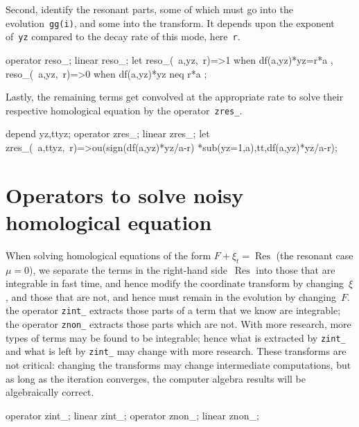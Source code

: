 \documentclass[11pt,a5paper]{article}
\newcommand{\res}{\operatorname{Res}}
\begin{document}
Second, identify the resonant parts, some of which must go into the evolution~\verb|gg(i)|, and some into the transform.
It depends upon the exponent of~\verb|yz| compared to the decay rate of this mode, here~\verb|r|.
\begin{reduce}
operator reso_; linear reso_;
let { reso_(~a,yz,~r)=>1 when df(a,yz)*yz=r*a
    , reso_(~a,yz,~r)=>0 when df(a,yz)*yz neq r*a
    };
\end{reduce}

Lastly, the remaining terms get convolved at the appropriate rate to solve their respective homological equation by the operator~\verb|zres_|.
\begin{reduce}
depend yz,ttyz;
operator zres_; linear zres_;
let zres_(~a,ttyz,~r)=>ou(sign(df(a,yz)*yz/a-r)
    *sub(yz=1,a),tt,df(a,yz)*yz/a-r);
\end{reduce}




\section{Operators to solve noisy homological equation}

When solving homological equations of the form $F+\xi_t=\res$ (the resonant case $\mu=0$), we separate the terms in the right-hand side~$\res$ into those that are integrable in fast time, and hence modify the coordinate transform by changing~$\xi$, and those that are not, and hence must remain in the evolution by changing~$F$.  the operator \verb|zint_| extracts those parts of a term that we know are integrable; the operator \verb|znon_| extracts those parts which are not.
With more research, more types of terms may be found to be integrable; hence what is extracted by \verb|zint_| and what is left by \verb|zint_| may change with more research.
These transforms are not critical: changing the transforms may change intermediate computations, but as long as the iteration converges, the computer algebra results will be algebraically correct.
\begin{reduce}
operator zint_; linear zint_;
operator znon_; linear znon_;
\end{reduce}
\end{document}
